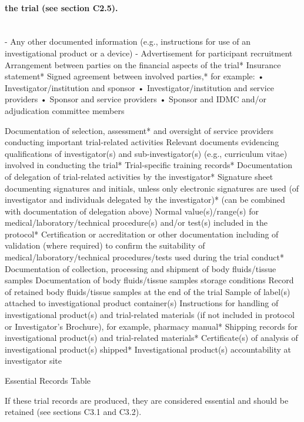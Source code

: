 \documentclass[11pt]{article}
\begin{document}
\paragraph{the trial (see section C2.5).}\mbox{}\\

- Any other documented information (e.g., instructions for use of an investigational product or a device) - Advertisement for participant recruitment Arrangement between parties on the financial aspects of the trial* Insurance statement* Signed agreement between involved parties,* for example: • Investigator/institution and sponsor • Investigator/institution and service providers • Sponsor and service providers • Sponsor and IDMC and/or adjudication committee members


Documentation of selection, assessment* and oversight of service providers conducting important trial-related activities Relevant documents evidencing qualifications of investigator(s) and sub-investigator(s) (e.g., curriculum vitae) involved in conducting the trial* Trial-specific training records* Documentation of delegation of trial-related activities by the investigator* Signature sheet documenting signatures and initials, unless only electronic signatures are used (of investigator and individuals delegated by the investigator)* (can be combined with documentation of delegation above) Normal value(s)/range(s) for medical/laboratory/technical procedure(s) and/or test(s) included in the protocol* Certification or accreditation or other documentation including of validation (where required) to confirm the suitability of medical/laboratory/technical procedures/tests used during the trial conduct* Documentation of collection, processing and shipment of body fluids/tissue samples Documentation of body fluids/tissue samples storage conditions Record of retained body fluids/tissue samples at the end of the trial Sample of label(s) attached to investigational product container(s) Instructions for handling of investigational product(s) and trial-related materials (if not included in protocol or Investigator's Brochure), for example, pharmacy manual* Shipping records for investigational product(s) and trial-related materials* Certificate(s) of analysis of investigational product(s) shipped* Investigational product(s) accountability at investigator site


Essential Records Table


If these trial records are produced, they are considered essential and should be retained (see sections C3.1 and C3.2).
\end{document}
